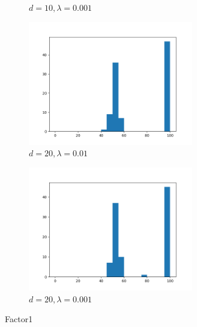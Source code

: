 \documentclass[titlepage]{report}
\begin{document}
\begin{figure}[H]
\begin{subfigure}{7cm}
\caption{$d = 10, \lambda = 0.001$}
\end{subfigure}
\begin{subfigure}{7cm}
\centering\includegraphics[width = 72mm]{figures/histograms/factor1/manual/20-01}
\caption{$d = 20, \lambda = 0.01$}
\end{subfigure}
\begin{subfigure}{7cm}
\centering\includegraphics[width = 72mm]{figures/histograms/factor1/manual/20-001}
\caption{$d = 20, \lambda = 0.001$}
\end{subfigure}
\caption{Factor1}
\end{figure}
\end{document}

